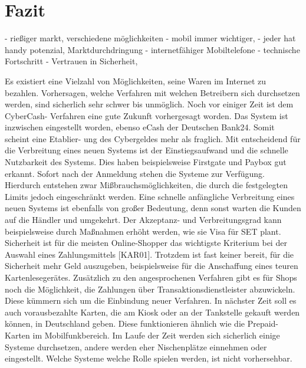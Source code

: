 \clearpage
\section{Fazit}
- rießiger markt, verschiedene möglichkeiten
- mobil immer wichtiger,
	- jeder hat handy potenzial, Marktdurchdringung
	- internetfähiger Mobiltelefone
	- technische Fortschritt
- Vertrauen in Sicherheit, 


Es existiert eine Vielzahl von Möglichkeiten, seine Waren im Internet zu bezahlen.
Vorhersagen, welche Verfahren mit welchen Betreibern sich durchsetzen werden, sind
sicherlich sehr schwer bis unmöglich. Noch vor einiger Zeit ist dem CyberCash-
Verfahren eine gute Zukunft vorhergesagt worden. Das System ist inzwischen
eingestellt worden, ebenso eCash der Deutschen Bank24. Somit scheint eine Etablier-
ung des Cybergeldes mehr als fraglich.
Mit entscheidend für die Verbreitung eines neuen Systems ist der Einstiegsaufwand
und die schnelle Nutzbarkeit des Systems. Dies haben beispielsweise Firstgate und
Paybox gut erkannt. Sofort nach der Anmeldung stehen die Systeme zur Verfügung.
Hierdurch entstehen zwar Mißbrauchsmöglichkeiten, die durch die festgelegten Limits
jedoch eingeschränkt werden.
Eine schnelle anfängliche Verbreitung eines neuen Systems ist ebenfalls von großer
Bedeutung, denn sonst warten die Kunden auf die Händler und umgekehrt. Der
Akzeptanz- und Verbreitungsgrad kann beispielsweise durch Maßnahmen erhöht
werden, wie sie Visa für SET plant.
Sicherheit ist für die meisten Online-Shopper das wichtigste Kriterium bei der
Auswahl eines Zahlungsmittels [KAR01]. Trotzdem ist fast keiner bereit, für die
Sicherheit mehr Geld auszugeben, beispielsweise für die Anschaffung eines teuren
Kartenlesegerätes.
Zusätzlich zu den angesprochenen Verfahren gibt es für Shops noch die Möglichkeit,
die Zahlungen über Transaktionsdienstleister abzuwickeln. Diese kümmern sich um
die Einbindung neuer Verfahren. In nächster Zeit soll es auch vorausbezahlte Karten,
die am Kiosk oder an der Tankstelle gekauft werden können, in Deutschland geben.
Diese funktionieren ähnlich wie die Prepaid-Karten im Mobilfunkbereich.
Im Laufe der Zeit werden sich sicherlich einige Systeme durchsetzen, andere werden
eher Nischenplätze einnehmen oder eingestellt. Welche Systeme welche Rolle spielen
werden, ist nicht vorhersehbar.

